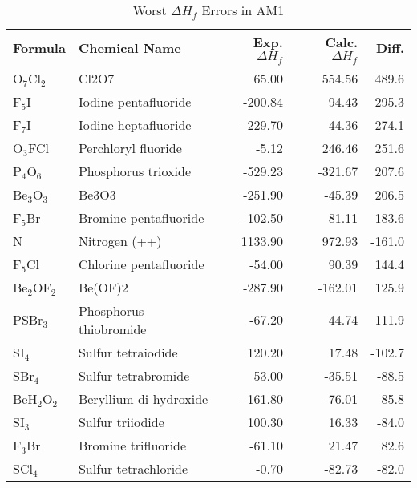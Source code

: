 \begin{table}
\caption{\label{weam1} Worst $\Delta H_f$ Errors in AM1}
\compresstable
\begin{center}
\begin{tabular}{llrrr}
 Formula & Chemical Name & Exp. $\Delta H_f$ & Calc. $\Delta H_f$ & Diff.\\
 \hline
 O$_7$Cl$_2$          & Cl2O7                                  &   65.00   &   554.56   &  489.6\\
 F$_5$I               & Iodine pentafluoride                   & -200.84   &    94.43   &  295.3\\
 F$_7$I               & Iodine heptafluoride                   & -229.70   &    44.36   &  274.1\\
 O$_3$FCl             & Perchloryl fluoride                    &   -5.12   &   246.46   &  251.6\\
 P$_4$O$_6$           & Phosphorus trioxide                    & -529.23   &  -321.67   &  207.6\\
 Be$_3$O$_3$          & Be3O3                                  & -251.90   &   -45.39   &  206.5\\
 F$_5$Br              & Bromine pentafluoride                  & -102.50   &    81.11   &  183.6\\
 N                    & Nitrogen (++)                          & 1133.90   &   972.93   & -161.0\\
 F$_5$Cl              & Chlorine pentafluoride                 &  -54.00   &    90.39   &  144.4\\
 Be$_2$OF$_2$         & Be(OF)2                                & -287.90   &  -162.01   &  125.9\\
 PSBr$_3$             & Phosphorus thiobromide                 &  -67.20   &    44.74   &  111.9\\
 SI$_4$               & Sulfur tetraiodide                     &  120.20   &    17.48   & -102.7\\
 SBr$_4$              & Sulfur tetrabromide                    &   53.00   &   -35.51   &  -88.5\\
 BeH$_2$O$_2$         & Beryllium di-hydroxide                 & -161.80   &   -76.01   &   85.8\\
 SI$_3$               & Sulfur triiodide                       &  100.30   &    16.33   &  -84.0\\
 F$_3$Br              & Bromine trifluoride                    &  -61.10   &    21.47   &   82.6\\
 SCl$_4$              & Sulfur tetrachloride                   &   -0.70   &   -82.73   &  -82.0\\

\end{tabular}
\end{center}
\end{table}
